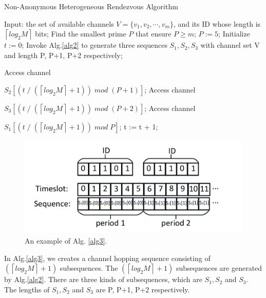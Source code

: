 \documentclass[10pt, conference, letterpaper]{IEEEtran}
\begin{document}
\begin{algorithm}
\caption{Non-Anonymous Heterogeneous Rendezvous Algorithm}
\label{alg3}
\begin{algorithmic}[1]
\STATE Input: the set of available channels $V=\{v_1,v_2,\cdots,v_m\}$, and its ID whose length is $\left \lceil log_2 M  \right \rceil$ bits;
\STATE Find the smallest prime $P$ that ensure $P \ge m$;
\STATE $P:= 5$;
\ENDIF
\STATE Initialize $t := 0$;
\STATE Invoke Alg.\ref{alg2} to generate three sequences $S_1,S_2,S_3$ with channel set V and length P, P+1, P+2 respectively;

   \STATE Access channel

    $S_2[(t\;/\;(\left \lceil log_2M \right \rceil+1))\;mod\;(P+1)]$;
    \ELSE
    \STATE Access channel

    $S_3[(t\;/\;(\left \lceil log_2M \right \rceil+1))\;mod\; (P+2)]$;
    \ENDIF
\ELSE
\STATE Access channel

$S_1[(t\;/\;(\left \lceil log_2M \right \rceil+1))\;mod\; P]$;
\ENDIF
\STATE t := t + 1;
\ENDWHILE

\end{algorithmic}
\end{algorithm}

\begin{figure}[!t]
\centering
\includegraphics[width=1\columnwidth]{round}
\caption{An example of Alg. {\ref{alg3}}.}
\label{exp-alg3}
\end{figure}

In Alg.\ref{alg3}, we creates a channel hopping sequence consisting of $(\left \lceil log_2M \right \rceil +1)$ subsequences. The $(\left \lceil log_2M \right \rceil +1)$ subsequences are generated by Alg.\ref{alg2}. There are three kinds of subsequences, which are $S_1, S_2$ and $S_3$. The lengths of $S_1, S_2$ and $S_3$ are P, P+1, P+2 respectively.
\end{document}
